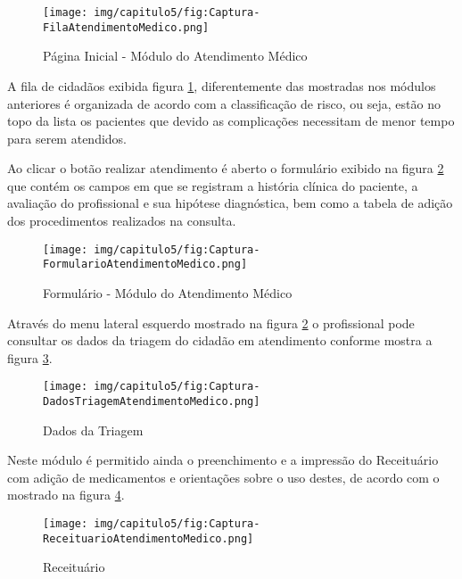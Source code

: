 \begin{figure}[H]
    \centering
     \caption{Página Inicial - Módulo do Atendimento Médico}
    \texttt{[image: img/capitulo5/fig:Captura-FilaAtendimentoMedico.png]}
    \label{fig:Captura-FilaAtendimentoMedico}
\end{figure}

A fila de cidadãos exibida figura \ref{fig:Captura-FilaAtendimentoMedico}, diferentemente das mostradas nos módulos anteriores é organizada de acordo com a classificação de risco, ou seja, estão no topo da lista os pacientes que devido as complicações necessitam de menor tempo para serem atendidos.

Ao clicar o botão realizar atendimento é aberto o formulário exibido na figura \ref{fig:Captura-FormularioAtendimentoMedico} que contém os campos em que se registram a história clínica do paciente, a avaliação do profissional e sua hipótese diagnóstica, bem como a tabela de adição dos procedimentos realizados na consulta.

\begin{figure}[H]
    \centering
     \caption{Formulário - Módulo do Atendimento Médico}
    \texttt{[image: img/capitulo5/fig:Captura-FormularioAtendimentoMedico.png]}
    \label{fig:Captura-FormularioAtendimentoMedico}
\end{figure}

Através do menu lateral esquerdo mostrado na figura \ref{fig:Captura-FormularioAtendimentoMedico} o profissional pode consultar os dados da triagem do cidadão em atendimento conforme mostra a figura \ref{fig:Captura-DadosTriagemAtendimentoMedico}.

\begin{figure}[H]
    \centering
     \caption{Dados da Triagem}
    \texttt{[image: img/capitulo5/fig:Captura-DadosTriagemAtendimentoMedico.png]}
    \label{fig:Captura-DadosTriagemAtendimentoMedico}
\end{figure}

Neste módulo é permitido ainda o preenchimento e a impressão do Receituário com adição de medicamentos e orientações sobre o uso destes, de acordo com o mostrado na figura \ref{fig:Captura-ReceituarioAtendimentoMedico}. 

\begin{figure}[H]
    \centering
     \caption{Receituário}
    \texttt{[image: img/capitulo5/fig:Captura-ReceituarioAtendimentoMedico.png]}
    \label{fig:Captura-ReceituarioAtendimentoMedico}
\end{figure}

